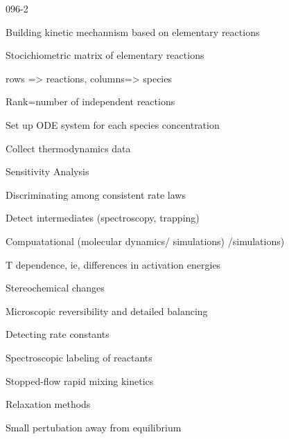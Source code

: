 \begin{mitframe}{096-2}
\begin{listone}
	\item Building kinetic mechannism based on elementary reactions
    \begin{listtwo}
    	\item Stocichiometric matrix of elementary reactions
        	\begin{listthree}
            	\item rows => reactions, columns=> species
                \item Rank=number of independent reactions
            \end{listthree}
    	\item Set up ODE system for each species concentration
        \item Collect thermodynamics data
        \item Sensitivity Analysis
    \end{listtwo}
	\item Discriminating among consistent rate laws
   		\begin{listtwo}
        	\item Detect intermediates (spectroscopy, trapping)
            \item Compuatational (molecular dynamics/ simulations) /simulations)
            \item T dependence, ie, differences in activation energies
            \item Stereochemical changes
            \item Microscopic reversibility and detailed balancing
        \end{listtwo}
	\item Detecting rate constants
    	\begin{listtwo}
        	\item Spectroscopic labeling of reactants
            \item Stopped-flow rapid mixing kinetics
            \item Relaxation methods
            	\begin{listthree}
                	\item Small pertubation away from equilibrium
                \end{listthree}
        \end{listtwo}
\end{listone}
\end{mitframe}